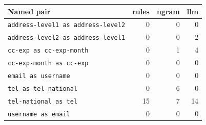 \begingroup\small\setlength{\tabcolsep}{4pt}
\begin{tabular}{lrrr}
\toprule
\textbf{Named pair} & \textbf{rules} & \textbf{ngram} & \textbf{llm} \\
\midrule
\texttt{address-level1 as address-level2} & 0 & 0 & 0 \\  %
\texttt{address-level2 as address-level1} & 0 & 0 & 2 \\  %
\texttt{cc-exp as cc-exp-month} & 0 & 1 & 4 \\  %
\texttt{cc-exp-month as cc-exp} & 0 & 0 & 0 \\  %
\texttt{email as username} & 0 & 0 & 0 \\  %
\texttt{tel as tel-national} & 0 & 6 & 0 \\  %
\texttt{tel-national as tel} & 15 & 7 & 14 \\  %
\texttt{username as email} & 0 & 0 & 0 \\  %
\bottomrule
\end{tabular}
\endgroup
\par\smallskip{}
